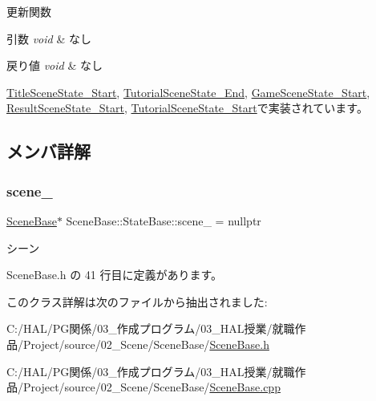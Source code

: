 更新関数 


\begin{DoxyParams}{引数}
{\em void} & なし \\
\hline
\end{DoxyParams}

\begin{DoxyRetVals}{戻り値}
{\em void} & なし \\
\hline
\end{DoxyRetVals}


\mbox{\hyperlink{class_title_scene_state___start_a2e98cf6810711b58766d7147168d02eb}{Title\+Scene\+State\+\_\+\+Start}}, \mbox{\hyperlink{class_tutorial_scene_state___end_a7cdf03fa9a0e41ab86c2b41b8165ad09}{Tutorial\+Scene\+State\+\_\+\+End}}, \mbox{\hyperlink{class_game_scene_state___start_ae11bb8d8ea9eae4fea2a9acf33dd1c8b}{Game\+Scene\+State\+\_\+\+Start}}, \mbox{\hyperlink{class_result_scene_state___start_a2ecdef2bef0cd1a04055e8687e11199b}{Result\+Scene\+State\+\_\+\+Start}}, \mbox{\hyperlink{class_tutorial_scene_state___start_a93c322692bf56172f383d3e5b17cd85c}{Tutorial\+Scene\+State\+\_\+\+Start}}で実装されています。



\subsection{メンバ詳解}
\mbox{\label{class_scene_base_1_1_state_base_ae1062afb3f96664e24504151eaccf40f}} 
\subsubsection{\texorpdfstring{scene\+\_\+}{scene\_}}
{\footnotesize\ttfamily \mbox{\hyperlink{class_scene_base}{Scene\+Base}}$\ast$ Scene\+Base\+::\+State\+Base\+::scene\+\_\+ = nullptr\hspace{0.3cm}{\ttfamily [private]}}



シーン 



 Scene\+Base.\+h の 41 行目に定義があります。



このクラス詳解は次のファイルから抽出されました\+:\begin{DoxyCompactItemize}
\item 
C\+:/\+H\+A\+L/\+P\+G関係/03\+\_\+作成プログラム/03\+\_\+\+H\+A\+L授業/就職作品/\+Project/source/02\+\_\+\+Scene/\+Scene\+Base/\mbox{\hyperlink{_scene_base_8h}{Scene\+Base.\+h}}\item 
C\+:/\+H\+A\+L/\+P\+G関係/03\+\_\+作成プログラム/03\+\_\+\+H\+A\+L授業/就職作品/\+Project/source/02\+\_\+\+Scene/\+Scene\+Base/\mbox{\hyperlink{_scene_base_8cpp}{Scene\+Base.\+cpp}}\end{DoxyCompactItemize}
